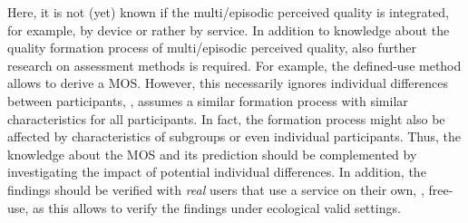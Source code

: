 Here, it is not (yet) known if the multi\-/episodic perceived quality is integrated, for example, by device or rather by service.
In addition to knowledge about the quality formation process of multi\-/episodic perceived quality, also further research on assessment methods is required.
For example, the defined-use method allows to derive a \ac{MOS}.
However, this necessarily ignores individual differences between participants, \ie, assumes a similar formation process with similar characteristics for all participants.
In fact, the formation process might also be affected by characteristics of subgroups or even individual participants.
Thus, the knowledge about the \ac{MOS} and its prediction should be complemented by investigating the impact of potential individual differences.
In addition, the findings should be verified with \emph{real} users that use a service on their own, \ie, free-use, as this allows to verify the findings under ecological valid settings.
